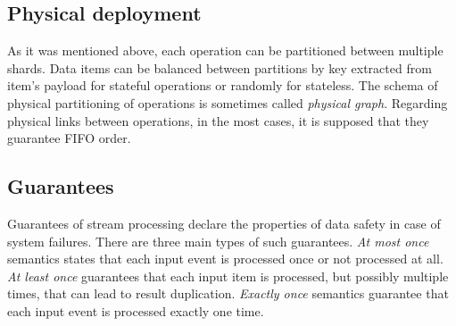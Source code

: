 \subsection{Physical deployment}
As it was mentioned above, each operation can be partitioned between multiple shards. Data items can be balanced between partitions by key extracted from item's payload for stateful operations or randomly for stateless. The schema of physical partitioning of operations is sometimes called {\it physical graph}. Regarding physical links between operations, in the most cases, it is supposed that they guarantee FIFO order.

\subsection{Guarantees}
Guarantees of stream processing declare the properties of data safety in case of system failures. There are three main types of such guarantees. {\it At most once} semantics states that each input event is processed once or not processed at all. {\it At least once} guarantees that each input item is processed, but possibly multiple times, that can lead to result duplication. {\it Exactly once} semantics guarantee that each input event is processed exactly one time.  
